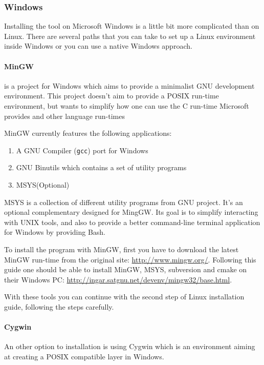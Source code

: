\subsubsection{Windows}
\par Installing the tool on Microsoft Windows is a little bit more complicated than on Linux. There are several paths that you can take to set up a Linux environment inside Windows or you can use a native Windows approach. 
\paragraph{MinGW} is a project for Windows which aims to provide a minimalist GNU development environment\cite{mingw_homepage}. This project doesn't aim to provide a POSIX run-time environment\cite{mingw_homepage}, but wants to simplify how one can use the C run-time Microsoft provides and other language run-times \medskip
\par MinGW currently features the following applications:
\begin{enumerate}
	\item A GNU Compiler (\verb|gcc|) port for Windows
	\item GNU Binutils which contains a set of utility programs
	\item MSYS(Optional)
\end{enumerate}
\par MSYS is a collection of different utility programs from GNU project. It's an optional complementary designed for MingGW\cite{mysis_page}. Its goal is to simplify interacting with UNIX tools, and also to provide a better command-line terminal application for Windows by providing Bash. \medskip
\par To install the program with MinGW, first you have to download the latest MinGW run-time from the original site: \url{http://www.mingw.org/}. Following this guide one should be able to install MinGW, MSYS, subversion and cmake on their Windows PC: \url{http://ingar.satgnu.net/devenv/mingw32/base.html}. \medskip
\par With these tools you can continue with the second step of Linux installation guide, following the steps carefully. \medskip
\paragraph{Cygwin}
\par An other option to installation is using Cygwin which is an environment aiming at creating a POSIX compatible layer in Windows. \medskip
